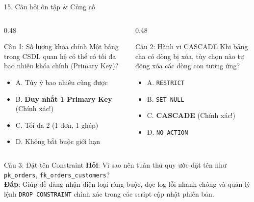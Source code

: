 \documentclass[aspectratio=169,11pt]{beamer}
\newcommand{\kw}[1]{\textcolor{dbblue}{\textbf{#1}}}
\newcommand{\smallgap}{\vspace{0.2em}}
\begin{document}
\begin{frame}{15. Câu hỏi ôn tập \& Củng cố}
\begin{columns}[t]
  \begin{column}{0.48\textwidth}
    \begin{block}{Câu 1: Số lượng khóa chính}
      Một bảng trong CSDL quan hệ có thể có tối đa bao nhiêu khóa chính (Primary Key)?
      \begin{itemize}
        \item A. Tùy ý bao nhiêu cũng được
        \item B. \textbf{\kw{Duy nhất 1 Primary Key}} (Chính xác!)
        \item C. Tối đa 2 (1 đơn, 1 ghép)
        \item D. Không bắt buộc giới hạn
      \end{itemize}
    \end{block}
  \end{column}
  \begin{column}{0.48\textwidth}
    \begin{block}{Câu 2: Hành vi CASCADE}
      Khi bảng cha có dòng bị xóa, tùy chọn nào tự động xóa các dòng con tương ứng?
      \begin{itemize}
        \item A. \texttt{RESTRICT}
        \item B. \texttt{SET NULL}
        \item C. \textbf{\kw{CASCADE}} (Chính xác!)
        \item D. \texttt{NO ACTION}
      \end{itemize}
    \end{block}
  \end{column}
\end{columns}
\smallgap
\begin{exampleblock}{Câu 3: Đặt tên Constraint}
  \textbf{Hỏi}: Vì sao nên tuân thủ quy ước đặt tên như \texttt{pk\_orders}, \texttt{fk\_orders\_customers}?\\
  \textbf{Đáp}: Giúp dễ dàng nhận diện loại ràng buộc, đọc log lỗi nhanh chóng và quản lý lệnh \texttt{DROP CONSTRAINT} chính xác trong các script cập nhật phiên bản.
\end{exampleblock}
\end{frame}
\end{document}
